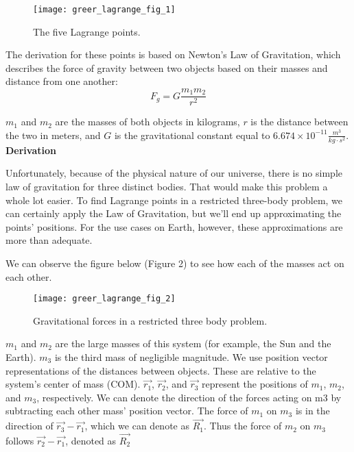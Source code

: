 \renewcommand{\thefigure}{1}
\begin{figure}[h]
  \begin{center}
    \texttt{[image: greer\_lagrange\_fig\_1]}
  \end{center}
  \caption{The five Lagrange points.}
  \label{fig:1}
\end{figure}

The derivation for these points is based on Newton’s Law of Gravitation, which describes the force of gravity between two objects based on their masses and distance from one another: \[F_g = G\frac{m_1m_2}{r^2}\]

$m_1$ and $m_2$ are the masses of both objects in kilograms, $r$ is the distance between the two in meters, and $G$ is the gravitational constant equal to $6.674\times{10^{-11}} \frac{m^3}{kg\cdot{}s^2}$.
\newline\newline
\textbf{Derivation}

Unfortunately, because of the physical nature of our universe, there is no simple law of gravitation for three distinct bodies. That would make this problem a whole lot easier. To find Lagrange points in a restricted three-body problem, we can certainly apply the Law of Gravitation, but we’ll end up approximating the points’ positions. For the use cases on Earth, however, these approximations are more than adequate. 

We can observe the figure below (Figure 2) to see how each of the masses act on each other. 

\renewcommand{\thefigure}{2}
\begin{figure}[h]
  \begin{center}
    \texttt{[image: greer\_lagrange\_fig\_2]}
  \end{center}
  \caption{Gravitational forces in a restricted three body problem.}
  \label{fig:2}
\end{figure}

$m_1$ and $m_2$ are the large masses of this system (for example, the Sun and the Earth). $m_3$ is the third mass of negligible magnitude. We use position vector representations of the distances between objects. These are relative to the system’s center of mass (COM). $\vec{r_1}$, $\vec{r_2}$, and $\vec{r_3}$ represent the positions of $m_1$, $m_2$, and $m_3$, respectively. We can denote the direction of the forces acting on m3 by subtracting each other mass’ position vector. The force of $m_1$ on $m_3$ is in the direction of $\vec{r_3}-\vec{r_1}$, which we can denote as $\vec{R_1}$. Thus the force of $m_2$ on $m_3$ follows $\vec{r_2}-\vec{r_1}$, denoted as $\vec{R_2}$

